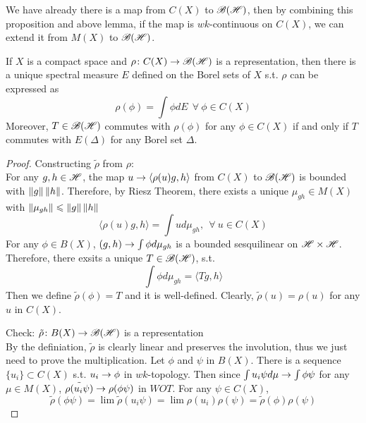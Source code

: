 \documentclass[a4paper,11pt]{report}
\begin{document}
We have already there is a map from $C(X)$ to $\mathscr{B(H)}$, then by combining this proposition and above lemma, if the map is $wk$-continuous on $C(X)$, we can extend it from $M(X)$ to $\mathscr{B(H)}$. 

\begin{thm}
	If $X$ is a compact space and $\rho \colon C(X) \rightarrow \mathscr{B(H)}$ is a representation, then there is a unique spectral measure $E$ defined on the Borel sets of $X$ s.t. $\rho$ can be expressed as 
	\begin{equation*}
		\rho(\phi) = \int \phi dE ~~\forall~\phi \in C(X)
	\end{equation*}
	Moreover, $T \in \mathscr{B(H)}$ commutes with $\rho(\phi)$ for any $\phi \in C(X)$ if and only if $T$ commutes with $E(\Delta)$ for any Borel set $\Delta$.
\end{thm}
\begin{proof}
	Constructing $\tilde{\rho}$ from $\rho$: \\
	For any $g,h \in \mathscr{H}$, the map $u \rightarrow \langle \rho(u)g,h \rangle$ from $C(X)$ to $\mathscr{B(H)}$ is bounded with $\left\lVert g\right\lVert\left\lVert h\right\lVert$. Therefore, by Riesz Theorem, there exists a unique $\mu_{gh} \in M(X)$ with $\left\lVert\mu_{gh}\right\lVert \leqslant \left\lVert g\right\lVert\left\lVert h\right\lVert$
	\begin{equation*}
		\langle \rho(u)g,h \rangle = \int u d\mu_{gh},~~\forall~u \in C(X)
	\end{equation*}
	For any $\phi \in B(X)$, $(g,h) \rightarrow \int \phi d\mu_{gh}$ is a bounded sesquilinear on $\mathscr{H} \times \mathscr{H}$. Therefore, there exsits a unique $T \in \mathscr{B(H)}$, s.t.
	\begin{equation*}
		\int \phi d\mu_{gh} = \langle Tg,h \rangle
	\end{equation*}
	Then we define $\tilde{\rho}(\phi) = T$ and it is well-defined. Clearly, $\tilde{\rho}(u) = \rho(u)$ for any $u$ in $C(X)$.
	\item Check: $\tilde{\rho} \colon B(X) \rightarrow \mathscr{B(H)}$ is a representation \\
	By the definiation, $\tilde{\rho}$ is clearly linear and preserves the involution, thus we just need to prove the multiplication. Let $\phi$ and $\psi$ in $B(X)$. There is a sequence $\{u_i\} \subset C(X)$ s.t. $u_i \rightarrow \phi$ in $wk$-topology. Then since $\int u_i\psi d\mu \rightarrow \int \phi\psi$ for any $\mu \in M(X)$,  $\tilde{\rho(u_i\psi)} \rightarrow \rho(\phi\psi)$ in $WOT$. For any $\psi \in C(X)$,
	\begin{equation*}
		\tilde{\rho}(\phi\psi) = \lim \tilde{\rho}(u_i\psi) = \lim \rho(u_i)\rho(\psi) = \tilde{\rho}(\phi)\rho(\psi)
	\end{equation*}

\end{proof}
\end{document}
